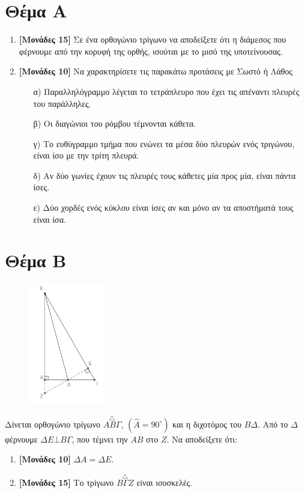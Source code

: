 \documentclass[12pt]{article}
\begin{document}
\section*{Θέμα Α}
  \noindent
  \begin{enumerate}
    \item \textbf{[Μονάδες 15]} Σε ένα ορθογώνιο τρίγωνο να αποδείξετε ότι η διάμεσος που φέρνουμε από την κορυφή της ορθής, ισούται με το μισό της υποτείνουσας.
    \item \textbf{[Μονάδες 10]}  Να χαρακτηρίσετε τις παρακάτω προτάσεις με Σωστό ή Λάθος
    \begin{enumerate}
      \item [α)] Παραλληλόγραμμο λέγεται το τετράπλευρο που έχει τις απέναντι πλευρές του παράλληλες.
      \item [β)] Οι διαγώνιοι του ρόμβου τέμνονται κάθετα.
      \item [γ)] Το ευθύγραμμο τμήμα που ενώνει τα μέσα δύο πλευρών ενός τριγώνου, είναι ίσο με την τρίτη πλευρά.
      \item [δ)] Αν δύο γωνίες έχουν τις πλευρές τους κάθετες μία προς μία, είναι πάντα ίσες.
      \item [ε)] Δύο χορδές ενός κύκλου είναι ίσες αν και μόνο αν τα αποστήματά τους είναι ίσα.
    \end{enumerate}
  \end{enumerate}

\section*{Θέμα Β}
  \noindent
  \begin{figure}
    \centering
    \vspace{-60pt}
    \includegraphics[width=0.3\textwidth]{2017AGeo2}
  \end{figure}
  Δίνεται ορθογώνιο τρίγωνο $\overset{\triangle}{ΑΒΓ}$, $\left( \hat{Α}= 90^{\circ} \right)$ και η διχοτόμος του $ΒΔ$. Από το $Δ$ φέρνουμε $ΔΕ \bot ΒΓ$, που τέμνει την $ΑΒ$ στο $Ζ$. Να αποδείξετε ότι:
  \begin{enumerate}
    \item \textbf{[Μονάδες 10]} $ΔΑ=ΔΕ$.
    \item \textbf{[Μονάδες 15]} Το τρίγωνο $\overset{\triangle}{ΒΓΖ}$ είναι ισοσκελές.
  \end{enumerate}
  \newpage
\end{document}
